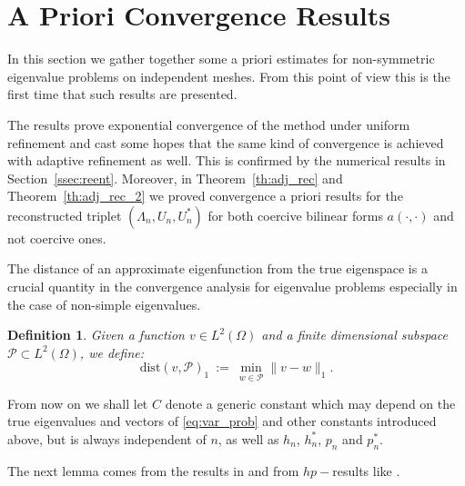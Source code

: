 \documentclass[preprint,12pt]{elsarticle}
\newtheorem{definition}[theorem]{Definition}
\begin{document}
\section{A Priori Convergence Results}\label{sse:pcf_priori}\label{sec:aprio}



In this section  we gather together some a priori estimates for non-symmetric eigenvalue
problems on independent meshes. From this point of view this is the first time that such results are presented. 

The results prove exponential convergence of the method under uniform refinement and cast some hopes that the same kind of convergence is achieved with adaptive refinement as well. This is confirmed by the numerical results in Section~\ref{ssec:reent}. 
Moreover, in Theorem~\ref{th:adj_rec} and Theorem~\ref{th:adj_rec_2} we proved convergence a priori results for the reconstructed triplet $(\Lambda_n,U_n,U_n^*)$ for both coercive bilinear forms $a(\cdot,\cdot)$ and not coercive ones.



The distance of an approximate eigenfunction from the true eigenspace
is a crucial quantity in the convergence analysis for
eigenvalue problems  especially in the case of non-simple
eigenvalues.

\begin{definition}
\label{def:dist_h1}
Given a function $v\in L^2(\Omega)$ and a finite dimensional subspace $\mathcal{P}\subset L^2(\Omega)$, we define:
$$
\mathrm{dist}(v,\mathcal{P})_{1}\ :=\ \min_{ w\in\mathcal{P}}  \|v-w\|_{1} .
$$

\end{definition}


From now on we shall let $C$ denote  a generic constant which 
may depend
on the 
true eigenvalues and vectors of \eqref{eq:var_prob} and other
constants introduced above, but is always independent of
$n$, as well as $h_n$, $h^*_n$, $p_n$ and $p^*_n$.  

The next lemma comes from the results in \cite{babuska}
and from $hp-$results like \cite[Theorem~4.72]{schwab}.
\end{document}
